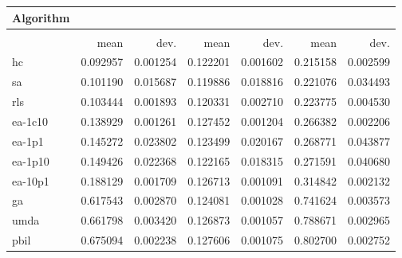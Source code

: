 \begin{tabular}{@{} l *{6}{>{{}}N{1}{2}} @{}}
\toprule
{Algorithm} &  \\
\midrule
&  &  &  \\
\midrule
& {mean} & {dev.} & {mean} & {dev.} & {mean} & {dev.} \\
\midrule
hc & 0.092957 & 0.001254 & 0.122201 & 0.001602 & 0.215158 & 0.002599 \\
sa & 0.101190 & 0.015687 & 0.119886 & 0.018816 & 0.221076 & 0.034493 \\
rls & 0.103444 & 0.001893 & 0.120331 & 0.002710 & 0.223775 & 0.004530 \\
ea-1c10 & 0.138929 & 0.001261 & 0.127452 & 0.001204 & 0.266382 & 0.002206 \\
ea-1p1 & 0.145272 & 0.023802 & 0.123499 & 0.020167 & 0.268771 & 0.043877 \\
ea-1p10 & 0.149426 & 0.022368 & 0.122165 & 0.018315 & 0.271591 & 0.040680 \\
ea-10p1 & 0.188129 & 0.001709 & 0.126713 & 0.001091 & 0.314842 & 0.002132 \\
ga & 0.617543 & 0.002870 & 0.124081 & 0.001028 & 0.741624 & 0.003573 \\
umda & 0.661798 & 0.003420 & 0.126873 & 0.001057 & 0.788671 & 0.002965 \\
pbil & 0.675094 & 0.002238 & 0.127606 & 0.001075 & 0.802700 & 0.002752 \\
\bottomrule
\end{tabular}
